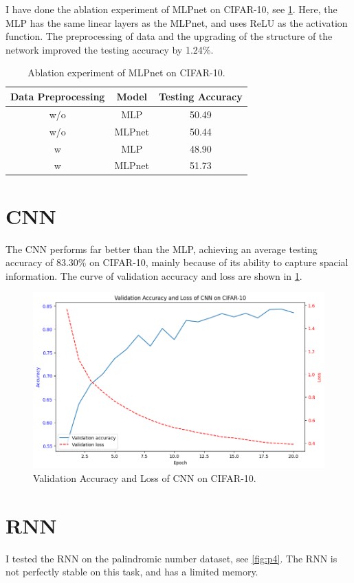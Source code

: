 \documentclass[12pt]{article}
\begin{document}
I have done the ablation experiment of MLPnet on CIFAR-10, see \cref{tab:tab1}. Here, the MLP has the same linear layers as the MLPnet, and uses ReLU as the activation function. The preprocessing of data and the upgrading of the structure of the network improved the testing accuracy by 1.24\%.

\begin{table}[htbp]
    \centering
    \begin{tabular}{|c|c|c|}
        \hline
         Data Preprocessing & Model & Testing Accuracy \\ \hline
         w/o & MLP & 50.49 \\ \hline
         w/o & MLPnet & 50.44 \\ \hline
         w & MLP & 48.90 \\ \hline
         w & MLPnet & 51.73 \\ \hline
    \end{tabular}
    \caption{Ablation experiment of MLPnet on CIFAR-10.}
    \label{tab:tab1}
\end{table}

\section{CNN}

The CNN performs far better than the MLP, achieving an average testing accuracy of $83.30\%$ on CIFAR-10, mainly because of its ability to capture spacial information. The curve of validation accuracy and loss are shown in \cref{fig:p3}.

\begin{figure}
    \centering
    \includegraphics[width=0.5\linewidth]{p2_fig1.png}
    \caption{Validation Accuracy and Loss of CNN on CIFAR-10.}
    \label{fig:p3}
\end{figure}

\section{RNN}

I tested the RNN on the palindromic number dataset, see \cref{fig:p4}. The RNN is not perfectly stable on this task, and has a limited memory.
\end{document}
